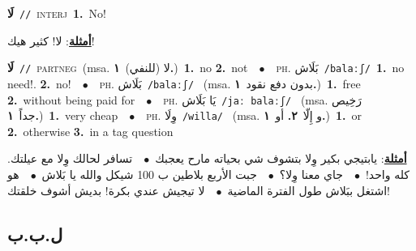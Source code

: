 \documentclass[10pt,a4paper,twoside]{article} %
\begin{document}
\begin{multicols}{2}
{\setlength\topsep{0pt}\textbf{\foreignlanguage{arabic}{لَا}}\ {\color{gray}\texttt{//}\color{black}}\ \textsc{interj}\ \textbf{1.}~No!\  \begin{flushright}\color{gray}\foreignlanguage{arabic}{\textbf{\underline{\foreignlanguage{arabic}{أمثلة}}}: لا! كثير هيك!}\end{flushright}\color{black}} \vspace{2mm}

{\setlength\topsep{0pt}\textbf{\foreignlanguage{arabic}{لَا}}\ {\color{gray}\texttt{//}\color{black}}\ \textsc{part\textunderscore neg}\ \color{gray}(msa. \foreignlanguage{arabic}{لا (للنفي)}~\foreignlanguage{arabic}{\textbf{١.}})\color{black}\ \textbf{1.}~no  \textbf{2.}~not\ \ $\bullet$\ \ \textsc{ph.} \color{gray} \foreignlanguage{arabic}{بَلَاش}\color{black}\ {\color{gray}\texttt{/{\sffamily balaːʃ}/}\color{black}}\ \textbf{1.}~no need!.  \textbf{2.}~no!\ \ $\bullet$\ \ \textsc{ph.} \color{gray} \foreignlanguage{arabic}{بَلَاش}\color{black}\ {\color{gray}\texttt{/{\sffamily balaːʃ}/}\color{black}}\ \color{gray} (msa. \foreignlanguage{arabic}{بدون دفع نقود}~\foreignlanguage{arabic}{\textbf{١.}})\color{black}\ \textbf{1.}~free  \textbf{2.}~without being paid for\ \ $\bullet$\ \ \textsc{ph.} \color{gray} \foreignlanguage{arabic}{يَا بَلَاش}\color{black}\ {\color{gray}\texttt{/{\sffamily jaː balaːʃ}/}\color{black}}\ \color{gray} (msa. \foreignlanguage{arabic}{رَخِيص جداً}~\foreignlanguage{arabic}{\textbf{١.}})\color{black}\ \textbf{1.}~very cheap\ \ $\bullet$\ \ \textsc{ph.} \color{gray} \foreignlanguage{arabic}{وِلَا}\color{black}\ {\color{gray}\texttt{/{\sffamily willa}/}\color{black}}\ \color{gray} (msa. \foreignlanguage{arabic}{و إِلّا}~\foreignlanguage{arabic}{\textbf{٢.}}  \foreignlanguage{arabic}{أو}~\foreignlanguage{arabic}{\textbf{١.}})\color{black}\ \textbf{1.}~or  \textbf{2.}~otherwise  \textbf{3.}~in a tag question\  \begin{flushright}\color{gray}\foreignlanguage{arabic}{\textbf{\underline{\foreignlanguage{arabic}{أمثلة}}}:  يابتيجي بكير وِلا بتشوف شي بحياته مارح يعجبك\ $\bullet$\ \  تسافر لحالك وِلا مع عيلتك. كله واحد!\ $\bullet$\ \  جاي معنا وِلا؟\ $\bullet$\ \  جبت الأربع بلاطين ب 100 شيكل والله يا بَلاش\ $\bullet$\ \  هو اشتغل ببَلاش طول الفترة الماضية\ $\bullet$\ \  لا تيجيش عندي بكرة! بديش أشوف خلقتك!}\end{flushright}\color{black}} \vspace{2mm}

\vspace{-3mm}
\subsection*{\color{blue}\foreignlanguage{arabic}{ل.ب.ب}\color{blue}{}} 


\end{multicols}
\end{document}
